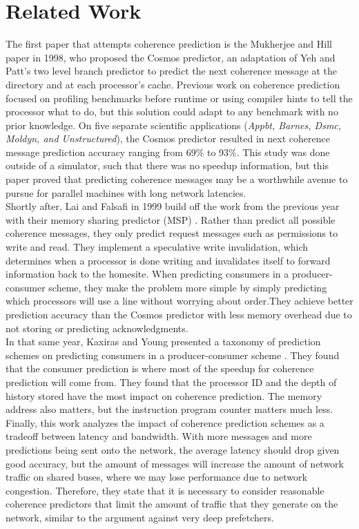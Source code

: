 \section{Related Work}
    The first paper that attempts coherence prediction is the Mukherjee and Hill paper in 1998, who proposed the Cosmos predictor, an adaptation of Yeh and Patt's two level branch predictor \cite{yeh_two_1991} to predict the next coherence message at the directory and at each processor's cache. Previous work on coherence prediction focused on profiling benchmarks before runtime or using compiler hints to tell the processor what to do, but this solution could adapt to any benchmark with no prior knowledge. On five separate scientific applications (\textit{Appbt, Barnes, Dsmc, Moldyn, and Unstructured}), the Cosmos predictor resulted in next coherence message prediction accuracy ranging from 69\% to 93\%. This study was done outside of a simulator, such that there was no speedup information, but this paper proved that predicting coherence messages may be a worthwhile avenue to pursue for parallel machines with long network latencies. \\

    Shortly after, Lai and Falsafi in 1999 build off the work from the previous year with their memory sharing predictor (MSP) \cite{lai_memory_1999}. Rather than predict all possible coherence messages, they only predict request messages such as permissions to write and read. They implement a speculative write invalidation, which determines when a processor is done writing and invalidates itself to forward information back to the homesite. When predicting consumers in a producer-consumer scheme, they make the problem more simple by simply predicting which processors will use a line without worrying about order.They achieve better prediction accuracy than the Cosmos predictor with less memory overhead due to not storing or predicting acknowledgments. \\

    In that same year, Kaxiras and Young presented a taxonomy of prediction schemes on predicting consumers in a producer-consumer scheme \cite{kaxiras_coherence_1999}. They found that the consumer prediction is where most of the speedup for coherence prediction will come from. They found that the processor ID and the depth of history stored have the most impact on coherence prediction. The memory address also matters, but the instruction program counter matters much less. Finally, this work analyzes the impact of coherence prediction schemes as a tradeoff between latency and bandwidth. With more messages and more predictions being sent onto the network, the average latency should drop given good accuracy, but the amount of messages will increase the amount of network traffic on shared buses, where we may lose performance due to network congestion. Therefore, they state that it is necessary to consider reasonable coherence predictors that limit the amount of traffic that they generate on the network, similar to the argument against very deep prefetchers. \\

